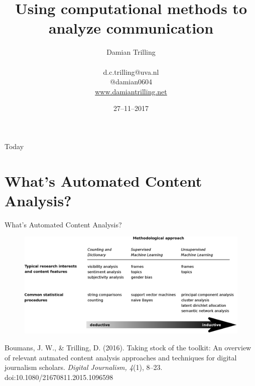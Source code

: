 \documentclass{beamer}
\begin{document}
\title{Using computational methods to analyze communication}
\author[Damian Trilling]{Damian Trilling \\ ~ \\ \footnotesize{d.c.trilling@uva.nl \\@damian0604} \\ \url{www.damiantrilling.net}}
\date{27--11--2017}



\begin{frame}{}
\titlepage
\end{frame}

\begin{frame}{Today}
\tableofcontents
\end{frame}



\section[What's ACA?]{What's Automated Content Analysis?}
\begin{frame}[plain]
	What's Automated Content Analysis?
\end{frame}


\begin{frame}[plain]
\begin{figure}
\centering
\includegraphics[width=1.0\linewidth]{boumanstrilling2016}
\label{fig:boumanstrilling2016}
\end{figure}
\tiny{Boumans, J. W., \& Trilling, D. (2016). Taking stock of the toolkit: An overview of relevant autmated content analysis approaches and techniques for digital journalism scholars. \emph{Digital Journalism, 4}(1), 8–23. doi:10.1080/21670811.2015.1096598}
\end{frame}
\end{document}

